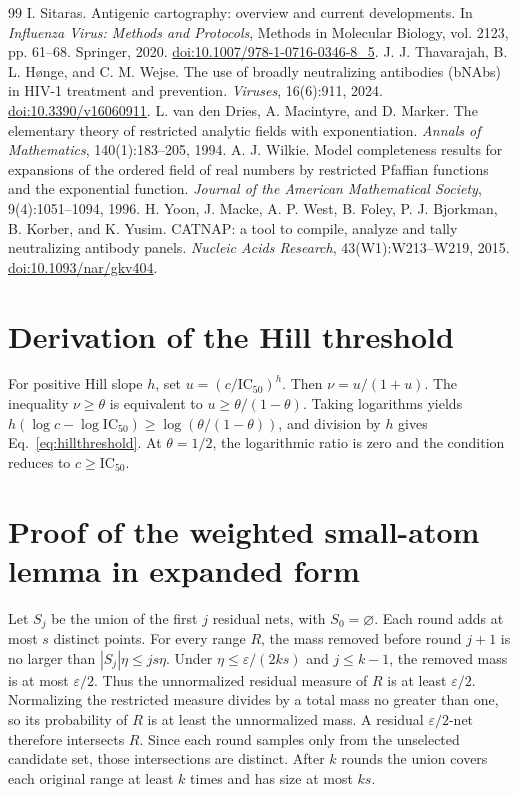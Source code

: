 \documentclass[11pt,a4paper]{article}
\newcommand{\eps}{\varepsilon}
\newcommand{\IC}{\mathrm{IC}_{50}}
\begin{document}
\begin{thebibliography}{99}
 I. Sitaras. Antigenic cartography: overview and current developments. In \emph{Influenza Virus: Methods and Protocols}, Methods in Molecular Biology, vol. 2123, pp. 61--68. Springer, 2020. \href{https://doi.org/10.1007/978-1-0716-0346-8_5}{doi:10.1007/978-1-0716-0346-8\_5}.
 J. J. Thavarajah, B. L. H\o nge, and C. M. Wejse. The use of broadly neutralizing antibodies (bNAbs) in HIV-1 treatment and prevention. \emph{Viruses}, 16(6):911, 2024. \href{https://doi.org/10.3390/v16060911}{doi:10.3390/v16060911}.
 L. van den Dries, A. Macintyre, and D. Marker. The elementary theory of restricted analytic fields with exponentiation. \emph{Annals of Mathematics}, 140(1):183--205, 1994.
 A. J. Wilkie. Model completeness results for expansions of the ordered field of real numbers by restricted Pfaffian functions and the exponential function. \emph{Journal of the American Mathematical Society}, 9(4):1051--1094, 1996.
 H. Yoon, J. Macke, A. P. West, B. Foley, P. J. Bjorkman, B. Korber, and K. Yusim. CATNAP: a tool to compile, analyze and tally neutralizing antibody panels. \emph{Nucleic Acids Research}, 43(W1):W213--W219, 2015. \href{https://doi.org/10.1093/nar/gkv404}{doi:10.1093/nar/gkv404}.
\end{thebibliography}

\appendix
\section{Derivation of the Hill threshold}
For positive Hill slope $h$, set $u=(c/\IC)^h$. Then $\nu=u/(1+u)$. The inequality $\nu\geq\theta$ is equivalent to $u\geq\theta/(1-\theta)$. Taking logarithms yields $h(\log c-\log\IC)\geq\log(\theta/(1-\theta))$, and division by $h$ gives Eq.~\eqref{eq:hillthreshold}. At $\theta=1/2$, the logarithmic ratio is zero and the condition reduces to $c\geq\IC$.

\section{Proof of the weighted small-atom lemma in expanded form}
Let $S_j$ be the union of the first $j$ residual nets, with $S_0=\varnothing$. Each round adds at most $s$ distinct points. For every range $R$, the mass removed before round $j+1$ is no larger than $|S_j|\eta\leq js\eta$. Under $\eta\leq\eps/(2ks)$ and $j\leq k-1$, the removed mass is at most $\eps/2$. Thus the unnormalized residual measure of $R$ is at least $\eps/2$. Normalizing the restricted measure divides by a total mass no greater than one, so its probability of $R$ is at least the unnormalized mass. A residual $\eps/2$-net therefore intersects $R$. Since each round samples only from the unselected candidate set, those intersections are distinct. After $k$ rounds the union covers each original range at least $k$ times and has size at most $ks$.
\end{document}
